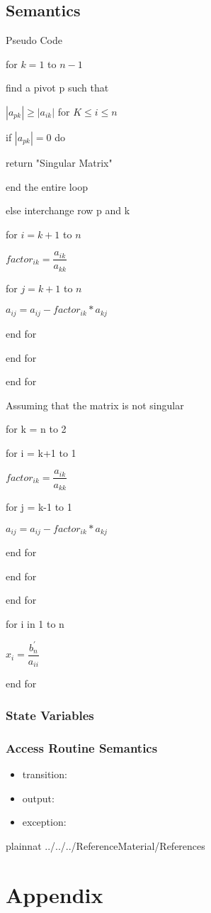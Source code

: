 \documentclass[12pt, titlepage]{article}
\begin{document}
\subsection{Semantics}

Pseudo Code

for $k = 1$ to $n-1$

find a pivot p such that

$|a_{pk}| \geq |a_{ik}|$ for $K \leq i \leq n$

if $|a_{pk}| = 0$ do

return "Singular Matrix"

end the entire loop

else interchange row p and k

for $i = k+1$ to $n$

$factor_{ik} = \dfrac{a_{ik}}{a_{kk}}$

for $j = k+1$ to $n$

$a_{ij} = a_{ij} - factor_{ik} * a_{kj}$

end for

end for

end for

Assuming that the matrix is not singular

for k = n to 2

for i = k+1 to 1

$factor_{ik} = \dfrac{a_{ik}}{a_{kk}}$

for j = k-1 to 1

$a_{ij} = a_{ij} - factor_{ik} * a_{kj}$

end for

end for

end for

for i in 1 to n

$x_i = \dfrac{b_n^{'}} {a_{ii}}$

end for



\subsubsection{State Variables}


\subsubsection{Access Routine Semantics}

\noindent %
\begin{itemize}
\item transition: %
\item output: %
\item exception: %
\end{itemize}


\newpage

 {plainnat}
 {../../../ReferenceMaterial/References}

\newpage

\section{Appendix} \label{Appendix}

\end{document}
